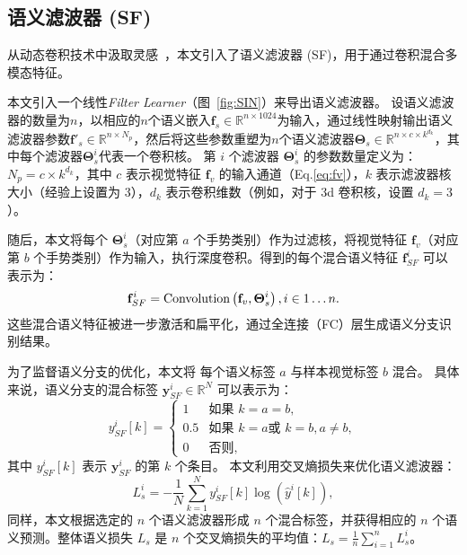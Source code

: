 \subsection{语义滤波器 (SF)}
从动态卷积技术中汲取灵感~\cite{yang2019condconv,chen2020dynamic}，本文引入了语义滤波器 (SF)，用于通过卷积混合多模态特征。%

本文引入一个线性\emph{Filter Learner}（图~\ref{fig:SIN}）来导出语义滤波器。
设语义滤波器的数量为$n$，以相应的$n$个语义嵌入$\mathbf{f}_{s} \in \mathbb{R}^{n\times 1024}$为输入，通过线性映射输出语义滤波器参数$\mathbf{f'}_{s}\in \mathbb{R}^{n\times N_p}$，然后将这些参数重塑为$n$个语义滤波器$\boldsymbol{\Theta}_{s}\in \mathbb{R}^{n\times c\times k^{d_k}}$，其中每个滤波器$\boldsymbol{\Theta}_{s}^i$代表一个卷积核。
第 $i$ 个滤波器 $\boldsymbol{\Theta}_{s}^i$ 的参数数量定义为：$N_p=c\times k^{d_k}$，其中 $c$ 表示视觉特征 $\mathbf{f}_{v}$ 的输入通道（Eq.\ref{eq:fv}），$k$ 表示滤波器核大小（经验上设置为 3），$d_k$ 表示卷积维数（例如，对于 3d 卷积核，设置 $d_k=3$）。

随后，本文将每个 $\boldsymbol{\Theta}_{s}^i$（对应第 $a$ 个手势类别）作为过滤核，将视觉特征 $\mathbf{f}_{v}$（对应第 $b$ 个手势类别）作为输入，执行深度卷积。得到的每个混合语义特征 $\mathbf{f}_{SF}^i$ 可以表示为：
\begin{equation}
\mathbf{f}_{SF}^{i} = \text{Convolution}\left(\mathbf{f}_{v}, \boldsymbol{\Theta}_{s}^i\right),\quad i \in 1\dots n. \\
\end{equation}
这些混合语义特征被进一步激活和扁平化，通过全连接（FC）层生成语义分支识别结果。

为了监督语义分支的优化，本文将 \cite{zuo2023natural} 每个语义标签 $a$ 与样本视觉标签 $b$ 混合。
具体来说，语义分支的混合标签 $\mathbf{y}_{SF}^i \in \mathbb{R}^N$ 可以表示为：
\begin{equation}
y_{SF}^i[k] = \begin{cases}
1 & \text{如果 } k = a = b,\\
0.5 & \text{如果 } k = a \text{或 } k = b, a\neq b,\\
0 & \text{否则,}
\end{cases}
\end{equation}
其中 $y_{SF}^i[k]$ 表示 $\mathbf{y}_{SF}^i$ 的第 $k$ 个条目。
本文利用交叉熵损失来优化语义滤波器：
\begin{equation}
L_{s}^i = -\frac{1}{N}\sum_{k=1}^{N}{{y}_{SF}^i[k] \log\left(\hat{y}^i[k]\right)},
\end{equation}
同样，本文根据选定的 $n$ 个语义滤波器形成 $n$ 个混合标签，并获得相应的 $n$ 个语义预测。整体语义损失 $L_{s}$ 是 $n$ 个交叉熵损失的平均值：$L_{s} = \frac{1}{n}\sum_{i=1}^{n}{L_{s}^i}$。

